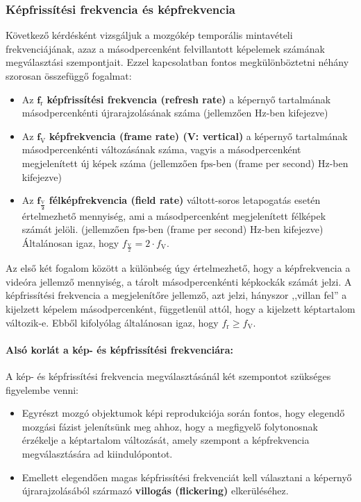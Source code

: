 \subsubsection*{Képfrissítési frekvencia és képfrekvencia}

Következő kérdésként vizsgáljuk a mozgókép temporális mintavételi frekvenciájának, azaz a másodpercenként felvillantott képelemek számának megválasztási szempontjait.
Ezzel kapcsolatban fontos megkülönböztetni néhány szorosan összefüggő fogalmat:
\begin{itemize}
\item Az $\mathbf{f_{\mathrm{r}}}$ \textbf{képfrissítési frekvencia (refresh rate)} a képernyő tartalmának másodpercenkénti újrarajzolásának száma (jellemzően $\mathrm{Hz}$-ben kifejezve)
\item Az $\mathbf{f_{\mathrm{V}}}$ \textbf{képfrekvencia (frame rate) (V: vertical)} a képernyő tartalmának másodpercenkénti változásának száma, vagyis a másodpercenként megjelenített új képek száma (jellemzően $\mathrm{fps}$-ben (frame per second) $\mathrm{Hz}$-ben kifejezve)
\item Az $\mathbf{f_{\frac{\mathrm{V}}{2}}}$ \textbf{félképfrekvencia (field rate)} váltott-soros letapogatás esetén értelmezhető mennyiség, ami a másodpercenként megjelenített félképek számát jelöli.
(jellemzően $\mathrm{fps}$-ben (frame per second) $\mathrm{Hz}$-ben kifejezve)
Általánosan igaz, hogy $f_{\frac{\mathrm{V}}{2}} = 2\cdot f_{\mathrm{V}}$.
\end{itemize}
Az első két fogalom között a különbség úgy értelmezhető, hogy a képfrekvencia a videóra jellemző mennyiség, a tárolt másodpercenkénti képkockák számát jelzi.
A képfrissítési frekvencia a megjelenítőre jellemző, azt jelzi, hányszor ,,villan fel'' a kijelzett képelem másodpercenként, függetlenül attól, hogy a kijelzett képtartalom változik-e.
Ebből kifolyólag általánosan igaz, hogy $f_{\mathrm{r}} \geq f_{\mathrm{V}}$.

\paragraph*{Alsó korlát a kép- és képfrissítési frekvenciára:}
A kép- és képfrissítési frekvencia megválasztásánál két szempontot szükséges figyelembe venni:
\begin{itemize}
\item Egyrészt mozgó objektumok képi reprodukciója során fontos, hogy elegendő mozgási fázist jelenítsünk meg ahhoz, hogy a megfigyelő folytonosnak érzékelje a képtartalom változását, amely szempont a képfrekvencia megválasztására ad kiindulópontot.
\item Emellett elegendően magas képfrissítési frekvenciát kell választani a képernyő újrarajzolásából származó \textbf{villogás (flickering)} elkerüléséhez.
\end{itemize}

